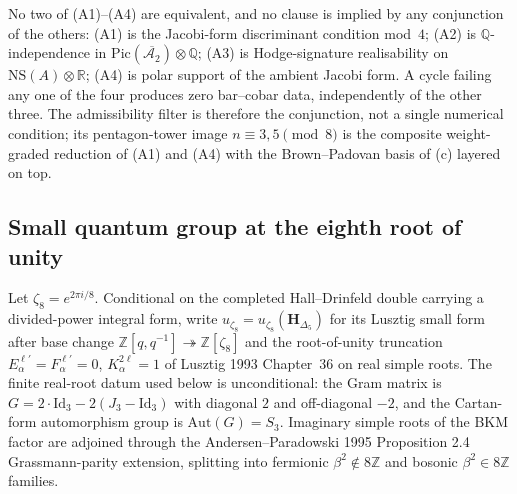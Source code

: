 \begin{remark}
\label{rem:hh-filter-orthogonality-A2}
%
No two of (A1)--(A4) are equivalent, and no clause is implied by any conjunction of the others:
\textup{(A1)} is the Jacobi-form discriminant condition mod~$4$;
\textup{(A2)} is $\mathbb{Q}$-independence in $\mathrm{Pic}(\overline{\mathcal{A}_2}) \otimes \mathbb{Q}$;
\textup{(A3)} is Hodge-signature realisability on $\mathrm{NS}(A) \otimes \mathbb{R}$;
\textup{(A4)} is polar support of the ambient Jacobi form.
A cycle failing any one of the four produces zero bar--cobar data, independently of the other three. The admissibility filter is therefore the conjunction, not a single numerical condition; its pentagon-tower image $n \equiv 3, 5 \pmod 8$ is the composite weight-graded reduction of (A1) and (A4) with the Brown--Padovan basis of \cite{VolI}(c) layered on top.
\end{remark}

\subsection{Small quantum group at the eighth root of unity}
\label{subsec:small-quantum-group-zeta8}

Let $\zeta_8 = e^{2\pi i/8}$. Conditional on the completed
Hall--Drinfeld double carrying a divided-power integral form, write
$u_{\zeta_8} = u_{\zeta_8}(\mathbf{H}_{\Delta_5})$ for its Lusztig
small form after base change
$\mathbb{Z}[q,q^{-1}]\twoheadrightarrow\mathbb{Z}[\zeta_8]$ and the
root-of-unity truncation $E_\alpha^{\ell'} = F_\alpha^{\ell'} = 0$,
$K_\alpha^{2\ell} = 1$ of Lusztig 1993 Chapter~36 on real simple roots.
The finite real-root datum used below is unconditional: the Gram matrix
is $G = 2\cdot\mathrm{Id}_3 - 2(J_3 - \mathrm{Id}_3)$ with diagonal $2$
and off-diagonal $-2$, and the Cartan-form automorphism group is
$\mathrm{Aut}(G) = S_3$. Imaginary simple roots of the BKM factor are
adjoined through the Andersen--Paradowski 1995 Proposition 2.4
Grassmann-parity extension, splitting into fermionic
$\beta^2\notin 8\mathbb{Z}$ and bosonic $\beta^2\in 8\mathbb{Z}$
families.

